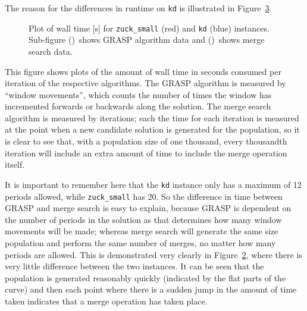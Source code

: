 \documentclass[authoryear,11pt,square,number,times,super,comma]{elsarticle}
\newcommand{\zucksmall}{\texttt{zuck\_small}}
\newcommand{\dmine}{\texttt{kd}}
\begin{document}
The reason for the differences in runtime on \dmine{} is illustrated in Figure~\ref{plot:mine:time}.
%
\begin{figure}[h!]
    \centering
    \begin{subfigure}[t]{0.4\textwidth}
    \centering
    \caption{}
    \label{plot:time.1}
    \end{subfigure}
    \quad
    \begin{subfigure}[t]{0.4\textwidth}
    \centering
    \caption{}
    \label{plot:time.2}
    \end{subfigure}
    \caption[Plot of wall time {[s]} for \zucksmall{} and \dmine{} instances]{Plot of wall time [s] for \zucksmall{} (red) and \dmine{} (blue) instances. Sub-figure ()~shows GRASP algorithm data and ()~shows merge search data.}
    \label{plot:mine:time}
\end{figure}
%
This figure shows plots of the amount of wall time in seconds consumed per iteration of the respective algorithms. The GRASP algorithm is measured by ``window movements'', which counts the number of times the window has incremented forwards or backwards along the solution. The merge search algorithm is measured by iterations; each the time for each iteration is measured at the point when a new candidate solution is generated for the population, so it is clear to see that, with a population size of one thousand, every thousandth iteration will include an extra amount of time to include the merge operation itself. 

It is important to remember here that the \dmine{} instance only has a maximum of 12 periods allowed, while \zucksmall{} has 20. So the difference in time between GRASP and merge search is easy to explain, because GRASP is dependent on the number of periods in the solution as that determines how many window movements will be made; whereas merge search will generate the same size population and perform the same number of merges, no matter how many periods are allowed. This is demonstrated very clearly in Figure~\ref{plot:time.2}, where there is very little difference between the two instances. It can be seen that the population is generated reasonably quickly (indicated by the flat parts of the curve) and then each point where there is a sudden jump in the amount of time taken indicates that a merge operation has taken place.
\end{document}
